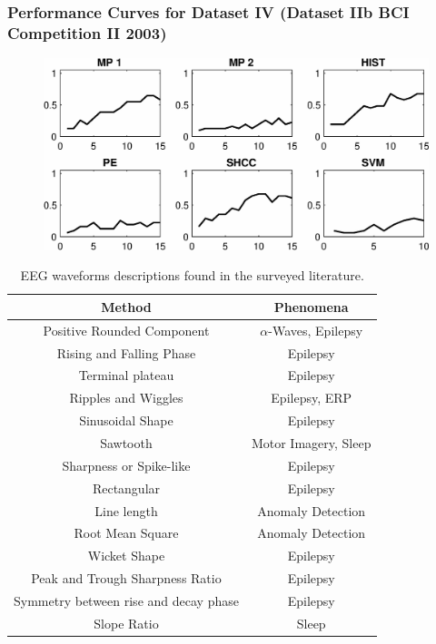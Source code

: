\documentclass[aspectratio=169]{beamer}
\begin{document}
\begin{frame}
\frametitle{Performance Curves for Dataset IV (Dataset IIb BCI Competition II 2003)}
\begin{center}
\begin{figure}[h!]
\centering
\includegraphics[width=14cm]{images/PerformanceBCICompetition.eps}
\label{fig:performancebcicompetition}
\end{figure}
\end{center}
\end{frame} 


\begin{frame}  
\begin{table}[h!]
\caption{EEG waveforms descriptions found in the surveyed literature.}
\centering
\begin{tabular}{cc}
\toprule
\textbf{Method}	& \textbf{Phenomena} 	\\
\midrule
Positive Rounded Component                    & $\alpha$-Waves, Epilepsy  \\
Rising and Falling Phase      & Epilepsy  \\
Terminal plateau      & Epilepsy  \\
Ripples and Wiggles     & Epilepsy, ERP  \\
Sinusoidal Shape        & Epilepsy  \\
Sawtooth                     & Motor Imagery, Sleep  \\
Sharpness or Spike-like     & Epilepsy  \\
Rectangular     & Epilepsy  \\
Line length       & Anomaly Detection\\
Root Mean Square & Anomaly Detection \\
Wicket Shape     & Epilepsy \\
Peak and Trough Sharpness Ratio     & Epilepsy \\
Symmetry between rise and decay phase     & Epilepsy  \\
Slope Ratio    & Sleep  \\
\bottomrule
\end{tabular}
\label{tab:methods}
\end{table}
\end{frame}  
\end{document}
